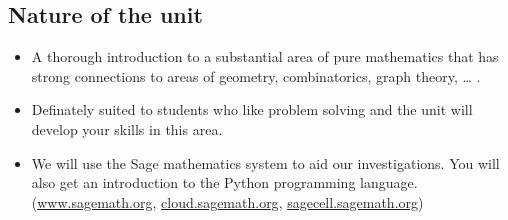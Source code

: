 \subsection{Nature of the unit}\label{nature-of-the-unit}

\begin{itemize}
\item
  A thorough introduction to a substantial area of pure mathematics that
  has strong connections to areas of geometry, combinatorics, graph
  theory, \ldots{} .
\item
  Definately suited to students who like problem solving and the unit
  will develop your skills in this area.
\item
  We will use the Sage mathematics system to aid our investigations. You
  will also get an introduction to the Python programming language.
  (\href{http://www.sagemath.org}{www.sagemath.org},
  \href{https://cloud.sagemath.org}{cloud.sagemath.org},
  \href{https://sagecell.sagemath.org}{sagecell.sagemath.org})
\end{itemize}
